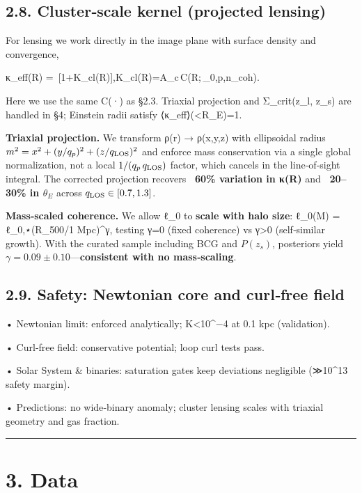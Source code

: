 \documentclass[11pt,a4paper]{article}
\begin{document}
\subsection{2.8. Cluster‑scale kernel (projected lensing)}


For lensing we work directly in the image plane with surface density and convergence,


κ\_eff(R) = \,[1+K\_{\rm cl}(R)],\quad K\_{\rm cl}(R)=A\_c\,C(R;\,\ell\_0,p,n\_{\rm coh}).


Here we use the same C(·) as §2.3. Triaxial projection and Σ\_crit(z\_l, z\_s) are handled in §4; Einstein radii satisfy ⟨κ\_eff⟩(<R\_E)=1.


\textbf{Triaxial projection.} We transform ρ(r) → ρ(x,y,z) with ellipsoidal radius $m^2 = x^2 + (y/q_p)^2 + (z/q_{\rm LOS})^2$ and enforce mass conservation via a single global normalization, not a local $1/(q_p\, q_{\rm LOS})$ factor, which cancels in the line‑of‑sight integral. The corrected projection recovers \textbf{~60\% variation in κ(R)} and \textbf{~20–30\% in $\theta_E$} across $q_{\rm LOS}\in[0.7,1.3]$.


\textbf{Mass‑scaled coherence.} We allow ℓ\_0 to \textbf{scale with halo size}: ℓ\_0(M) = ℓ\_{0,⋆}(R\_{500}/1 Mpc)^γ, testing γ=0 (fixed coherence) vs γ>0 (self‑similar growth). With the curated sample including BCG and $P(z_s)$, posteriors yield \textbf{$\gamma = 0.09 \pm 0.10$}—\textbf{consistent with no mass‑scaling}.



\subsection{2.9. Safety: Newtonian core and curl‑free field}


• Newtonian limit: enforced analytically; K<10^−4 at 0.1 kpc (validation).  

• Curl‑free field: conservative potential; loop curl tests pass.  

• Solar System \& binaries: saturation gates keep deviations negligible (≫10^13 safety margin).  

• Predictions: no wide‑binary anomaly; cluster lensing scales with triaxial geometry and gas fraction.



\medskip\hrule\medskip


\section{3. Data}
\end{document}
